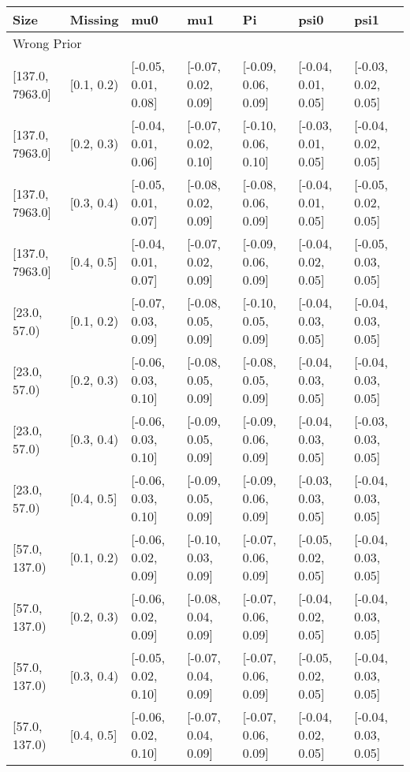 \begin{table}[ht]
\centering
\begin{tabular}{lllllll}
  \toprule
Size & Missing & mu0 & mu1 & Pi & psi0 & psi1 \\ 
  \midrule
\multicolumn{7}{l}{Wrong Prior}\\
{[137.0, 7963.0]} & {[0.1, 0.2)} & {[-0.05, 0.01, 0.08]} & {[-0.07, 0.02, 0.09]} & {[-0.09, 0.06, 0.09]} & {[-0.04, 0.01, 0.05]} & {[-0.03, 0.02, 0.05]} \\ 
  {[137.0, 7963.0]} & {[0.2, 0.3)} & {[-0.04, 0.01, 0.06]} & {[-0.07, 0.02, 0.10]} & {[-0.10, 0.06, 0.10]} & {[-0.03, 0.01, 0.05]} & {[-0.04, 0.02, 0.05]} \\ 
  {[137.0, 7963.0]} & {[0.3, 0.4)} & {[-0.05, 0.01, 0.07]} & {[-0.08, 0.02, 0.09]} & {[-0.08, 0.06, 0.09]} & {[-0.04, 0.01, 0.05]} & {[-0.05, 0.02, 0.05]} \\ 
  {[137.0, 7963.0]} & {[0.4, 0.5]} & {[-0.04, 0.01, 0.07]} & {[-0.07, 0.02, 0.09]} & {[-0.09, 0.06, 0.09]} & {[-0.04, 0.02, 0.05]} & {[-0.05, 0.03, 0.05]} \\ 
  {[23.0, 57.0)} & {[0.1, 0.2)} & {[-0.07, 0.03, 0.09]} & {[-0.08, 0.05, 0.09]} & {[-0.10, 0.05, 0.09]} & {[-0.04, 0.03, 0.05]} & {[-0.04, 0.03, 0.05]} \\ 
  {[23.0, 57.0)} & {[0.2, 0.3)} & {[-0.06, 0.03, 0.10]} & {[-0.08, 0.05, 0.09]} & {[-0.08, 0.05, 0.09]} & {[-0.04, 0.03, 0.05]} & {[-0.04, 0.03, 0.05]} \\ 
  {[23.0, 57.0)} & {[0.3, 0.4)} & {[-0.06, 0.03, 0.10]} & {[-0.09, 0.05, 0.09]} & {[-0.09, 0.06, 0.09]} & {[-0.04, 0.03, 0.05]} & {[-0.03, 0.03, 0.05]} \\ 
  {[23.0, 57.0)} & {[0.4, 0.5]} & {[-0.06, 0.03, 0.10]} & {[-0.09, 0.05, 0.09]} & {[-0.09, 0.06, 0.09]} & {[-0.03, 0.03, 0.05]} & {[-0.04, 0.03, 0.05]} \\ 
  {[57.0, 137.0)} & {[0.1, 0.2)} & {[-0.06, 0.02, 0.09]} & {[-0.10, 0.03, 0.09]} & {[-0.07, 0.06, 0.09]} & {[-0.05, 0.02, 0.05]} & {[-0.04, 0.03, 0.05]} \\ 
  {[57.0, 137.0)} & {[0.2, 0.3)} & {[-0.06, 0.02, 0.09]} & {[-0.08, 0.04, 0.09]} & {[-0.07, 0.06, 0.09]} & {[-0.04, 0.02, 0.05]} & {[-0.04, 0.03, 0.05]} \\ 
  {[57.0, 137.0)} & {[0.3, 0.4)} & {[-0.05, 0.02, 0.10]} & {[-0.07, 0.04, 0.09]} & {[-0.07, 0.06, 0.09]} & {[-0.05, 0.02, 0.05]} & {[-0.04, 0.03, 0.05]} \\ 
  {[57.0, 137.0)} & {[0.4, 0.5]} & {[-0.06, 0.02, 0.10]} & {[-0.07, 0.04, 0.09]} & {[-0.07, 0.06, 0.09]} & {[-0.04, 0.02, 0.05]} & {[-0.04, 0.03, 0.05]} \\ 

\end{tabular}
\end{table}
